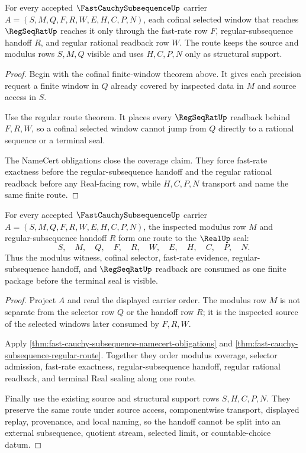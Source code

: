 \begin{theorem}
\label{thm:fast-cauchy-subsequence-cofinal-regseqrat-coverage}
For every accepted $\FastCauchySubsequenceUp$ carrier $A=(S,M,Q,F,R,W,E,H,C,P,N)$, each cofinal selected window that reaches $\RegSeqRatUp$ reaches it only through the fast-rate row $F$, regular-subsequence handoff $R$, and regular rational readback row $W$. The route keeps the source and modulus rows $S,M,Q$ visible and uses $H,C,P,N$ only as structural support.
\end{theorem}
\begin{proof}
Begin with the cofinal finite-window theorem above. It gives each precision request a finite window in $Q$ already covered by inspected data in $M$ and source access in $S$.

Use the regular route theorem. It places every $\RegSeqRatUp$ readback behind $F,R,W$, so a cofinal selected window cannot jump from $Q$ directly to a rational sequence or a terminal seal.

The NameCert obligations close the coverage claim. They force fast-rate exactness before the regular-subsequence handoff and the regular rational readback before any Real-facing row, while $H,C,P,N$ transport and name the same finite route.
\end{proof}

\begin{theorem}
\label{thm:fast-cauchy-subsequence-modulus-regular-handoff}
For every accepted $\FastCauchySubsequenceUp$ carrier $A=(S,M,Q,F,R,W,E,H,C,P,N)$, the inspected modulus row $M$ and regular-subsequence handoff $R$ form one route to the $\RealUp$ seal:
$$
S,\quad M,\quad Q,\quad F,\quad R,\quad W,\quad E,\quad H,\quad C,\quad P,\quad N .
$$
Thus the modulus witness, cofinal selector, fast-rate evidence, regular-subsequence handoff, and $\RegSeqRatUp$ readback are consumed as one finite package before the terminal seal is visible.
\end{theorem}
\begin{proof}
Project $A$ and read the displayed carrier order. The modulus row $M$ is not separate from the selector row $Q$ or the handoff row $R$; it is the inspected source of the selected windows later consumed by $F,R,W$.

Apply \autoref{thm:fast-cauchy-subsequence-namecert-obligations} and \autoref{thm:fast-cauchy-subsequence-regular-route}. Together they order modulus coverage, selector admission, fast-rate exactness, regular-subsequence handoff, regular rational readback, and terminal Real sealing along one route.

Finally use the existing source and structural support rows $S,H,C,P,N$. They preserve the same route under source access, componentwise transport, displayed replay, provenance, and local naming, so the handoff cannot be split into an external subsequence, quotient stream, selected limit, or countable-choice datum.
\end{proof}

